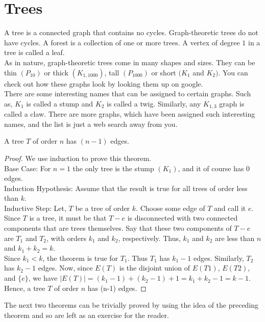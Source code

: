 \chapter{Trees}

A tree is a connected graph that contains no cycles. Graph-theoretic trees do not have cycles. A forest is a collection of one or more trees. A vertex of degree $1$ in a tree is called a leaf.\\
As in nature, graph-theoretic trees come in many shapes and sizes. They can be thin $(P_{10})$ or thick $(K_{1,1000})$, tall $(P_{1000})$ or short $(K_{1}$ and $K_{2})$. You can check out how these graphs look by looking them up on google.\\
There are some interesting names that can be assigned to certain graphs. Such as, $K_{1}$ is called a stump and $K_{2}$ is called a twig. Similarly, any $K_{1,3}$ graph is called a claw. There are more graphs, which have been assigned such interesting names, and the list is just a web search away from you.
\begin{thm}
    A tree $T$ of order $n$ has $(n-1)$ edges. 
\end{thm}
\begin{proof}
    We use induction to prove this theorem.\\
    Base Case: For $n=1$ the only tree is the stump $(K_{1})$, and it of course has $0$ edges.\\
    Induction Hypothesis:  Assume that the result is true for all trees of order less than $k$.\\
    Inductive Step: Let, $T$ be a tree of order $k$. Choose some edge of $T$ and call it $e$. Since $T$ is a tree, it must be that $T-e$ is disconnected with two connected components that are trees themselves. Say that these two components of $T-e$ are $T_{1}$ and $T_{2}$, with orders $k_{1}$ and $k_{2}$, respectively. Thus, $k_{1}$ and $k_{2}$ are less than $n$ and $k_{1} + k_{2} = k$.\\
    Since $k_{1} < k$, the theorem is true for $T_{1}$. Thus $T_{1}$ has $k_{1}-1$ edges. Similarly, $T_{2}$ has $k_{2}-1$ edges. Now, since $E(T)$ is the disjoint union of $E(T1)$, $E(T2)$, and $\{e\}$, we have $|E(T)|=(k_{1}-1) + (k_{2}-1) + 1 = k_{1} + k_{2} - 1 = k-1$.\\
    Hence, a tree $T$ of order $n$ has (n-1) edges.
\end{proof}

The next two theorems can be trivially proved by using the idea of the preceding theorem and so are left as an exercise for the reader.

